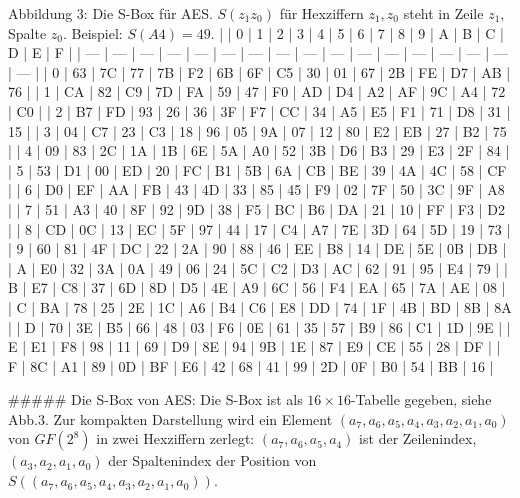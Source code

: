 \documentclass[a4paper]{article}
\begin{document}
\begin{multicols}{3}
    Abbildung 3: Die S-Box für AES. $S(z_1 z_0)$ für Hexziffern $z_1,z_0$ steht in Zeile $z_1$, Spalte $z_0$. Beispiel: $S(A4)=49$.
    |     | 0   | 1   | 2   | 3   | 4   | 5   | 6   | 7   | 8   | 9   | A   | B   | C   | D   | E   | F   |
    | --- | --- | --- | --- | --- | --- | --- | --- | --- | --- | --- | --- | --- | --- | --- | --- | --- |
    | 0   | 63  | 7C  | 77  | 7B  | F2  | 6B  | 6F  | C5  | 30  | 01  | 67  | 2B  | FE  | D7  | AB  | 76  |
    | 1   | CA  | 82  | C9  | 7D  | FA  | 59  | 47  | F0  | AD  | D4  | A2  | AF  | 9C  | A4  | 72  | C0  |
    | 2   | B7  | FD  | 93  | 26  | 36  | 3F  | F7  | CC  | 34  | A5  | E5  | F1  | 71  | D8  | 31  | 15  |
    | 3   | 04  | C7  | 23  | C3  | 18  | 96  | 05  | 9A  | 07  | 12  | 80  | E2  | EB  | 27  | B2  | 75  |
    | 4   | 09  | 83  | 2C  | 1A  | 1B  | 6E  | 5A  | A0  | 52  | 3B  | D6  | B3  | 29  | E3  | 2F  | 84  |
    | 5   | 53  | D1  | 00  | ED  | 20  | FC  | B1  | 5B  | 6A  | CB  | BE  | 39  | 4A  | 4C  | 58  | CF  |
    | 6   | D0  | EF  | AA  | FB  | 43  | 4D  | 33  | 85  | 45  | F9  | 02  | 7F  | 50  | 3C  | 9F  | A8  |
    | 7   | 51  | A3  | 40  | 8F  | 92  | 9D  | 38  | F5  | BC  | B6  | DA  | 21  | 10  | FF  | F3  | D2  |
    | 8   | CD  | 0C  | 13  | EC  | 5F  | 97  | 44  | 17  | C4  | A7  | 7E  | 3D  | 64  | 5D  | 19  | 73  |
    | 9   | 60  | 81  | 4F  | DC  | 22  | 2A  | 90  | 88  | 46  | EE  | B8  | 14  | DE  | 5E  | 0B  | DB  |
    | A   | E0  | 32  | 3A  | 0A  | 49  | 06  | 24  | 5C  | C2  | D3  | AC  | 62  | 91  | 95  | E4  | 79  |
    | B   | E7  | C8  | 37  | 6D  | 8D  | D5  | 4E  | A9  | 6C  | 56  | F4  | EA  | 65  | 7A  | AE  | 08  |
    | C   | BA  | 78  | 25  | 2E  | 1C  | A6  | B4  | C6  | E8  | DD  | 74  | 1F  | 4B  | BD  | 8B  | 8A  |
    | D   | 70  | 3E  | B5  | 66  | 48  | 03  | F6  | 0E  | 61  | 35  | 57  | B9  | 86  | C1  | 1D  | 9E  |
    | E   | E1  | F8  | 98  | 11  | 69  | D9  | 8E  | 94  | 9B  | 1E  | 87  | E9  | CE  | 55  | 28  | DF  |
    | F   | 8C  | A1  | 89  | 0D  | BF  | E6  | 42  | 68  | 41  | 99  | 2D  | 0F  | B0  | 54  | BB  | 16  |

    ##### Die S-Box von AES:
    Die S-Box ist als $16\times 16$-Tabelle gegeben, siehe Abb.3. Zur kompakten Darstellung wird ein Element $(a_7,a_6,a_5,a_4,a_3,a_2,a_1,a_0)$ von $GF(2^8)$ in zwei Hexziffern zerlegt: $(a_7,a_6,a_5,a_4)$ ist der Zeilenindex, $(a_3,a_2,a_1,a_0)$ der Spaltenindex der Position von $S((a_7,a_6,a_5,a_4,a_3,a_2,a_1,a_0))$.


\end{multicols}
\end{document}
